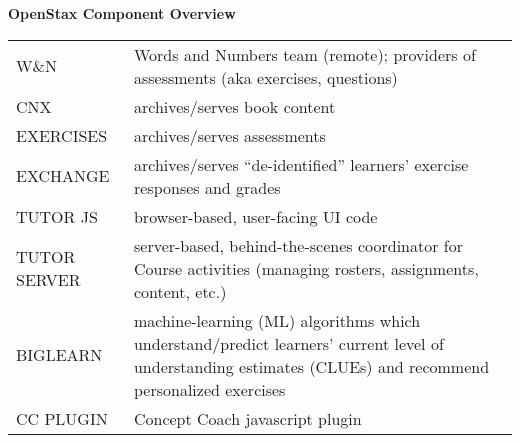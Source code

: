 \documentclass[a4paper,10pt]{minimal}
\begin{document}
\begin{center}
  \textbf{OpenStax Component Overview}
\end{center}

\vspace{1cm}

\begin{tabular}{ p{1.5in} p{5.5in} }
  W\&N         & Words and Numbers team (remote);
                 providers of assessments
                 (aka exercises, questions) \\
  CNX          & archives/serves book content \\
  EXERCISES    & archives/serves assessments \\
  EXCHANGE     & archives/serves ``de-identified'' learners' exercise responses and grades \\
  TUTOR JS     & browser-based, user-facing UI code \\
  TUTOR SERVER & server-based, behind-the-scenes coordinator
                 for Course activities
                 (managing rosters, assignments, content, etc.) \\
  BIGLEARN     & machine-learning (ML) algorithms
                 which understand/predict learners'
                 current level of understanding estimates (CLUEs)
                 and recommend personalized exercises \\
  CC PLUGIN    & Concept Coach javascript plugin
\end{tabular}

\vspace{1cm}
\end{document}
